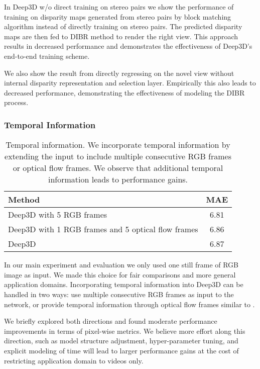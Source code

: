\documentclass[runningheads]{llncs}
\begin{document}
In Deep3D w/o direct training on stereo pairs we show the performance of training on disparity maps generated from stereo pairs by block matching algorithm \cite{hirschmuller2008stereo} instead of directly training on stereo pairs.
The predicted disparity maps are then fed to DIBR method to render the right view.
This approach results in decreased performance and demonstrates the effectiveness of Deep3D's end-to-end training scheme.

We also show the result from directly regressing on the novel view without internal disparity representation and selection layer.
Empirically this also leads to decreased performance, demonstrating the effectiveness of modeling the DIBR process.

\subsubsection{Temporal Information}\label{sec:tempo}\begin{table}[!ht]
\begin{center}
\caption{Temporal information. We incorporate temporal information by extending the input to include multiple consecutive RGB frames or optical flow frames. We observe that additional temporal information leads to performance gains.}
\label{table:tempo}
\begin{tabular}{lc}
\hline\noalign{\smallskip}
Method & MAE\\
\hline
Deep3D with 5 RGB frames                                   & 6.81\\
Deep3D with 1 RGB frames and 5 optical flow frames \hspace{0.3in}         & 6.86\\
Deep3D                                                     & 6.87\\
\hline
\end{tabular}
\end{center}
\end{table}

In our main experiment and evaluation we only used one still frame of RGB image as input.
We made this choice for fair comparisons and more general application domains.
Incorporating temporal information into Deep3D can be handled in two ways:
use multiple consecutive RGB frames as input to the network,
or provide temporal information through optical flow frames similar to \cite{wang2015towards}.

We briefly explored both directions and found moderate performance improvements in terms of pixel-wise metrics.
We believe more effort along this direction, such as model structure adjustment, hyper-parameter tuning, and explicit modeling of time will lead to larger performance gains at the cost of restricting application domain to videos only.
\end{document}
